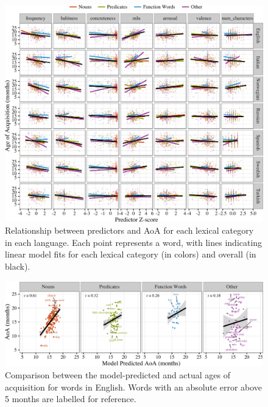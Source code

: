 \documentclass[10pt, letterpaper]{article}
\newenvironment{CodeChunk}{}{}
\begin{document}
\begin{CodeChunk}
\begin{figure}[tb]

{\centering \includegraphics{figs/data-1} 

}

\caption[Relationship between predictors and AoA for each lexical category in each language]{Relationship between predictors and AoA for each lexical category in each language. Each point represents a word, with lines indicating linear model fits for each lexical category (in colors) and overall (in black).}\label{fig:data}
\end{figure}
\end{CodeChunk}

\begin{CodeChunk}
\begin{figure}[tb]

{\centering \includegraphics{figs/fit-1} 

}

\caption[Comparison between the model-predicted and actual ages of acquisition for words in English]{Comparison between the model-predicted and actual ages of acquisition for words in English. Words with an absolute error above 5 months are labelled for reference.}\label{fig:fit}
\end{figure}
\end{CodeChunk}
\end{document}
